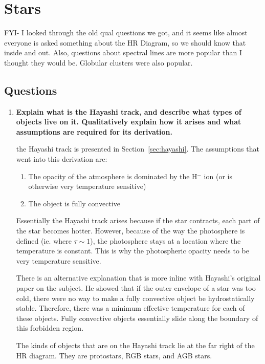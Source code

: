 \section{Stars}

FYI- I looked through the old qual questions we got, and it seems like almost everyone is asked 
something about the HR Diagram, so we should know that inside and out.  Also, questions about 
spectral lines are more popular than I thought they would be.  Globular clusters were also popular.

\subsection{Questions}
\begin{enumerate}
\item \textbf{Explain what is the Hayashi track, and describe what types of objects live on it.
      Qualitatively explain how it arises and what assumptions are required for its derivation.}

       the Hayashi track is presented in Section~\ref{sec:hayashi}.
      The assumptions that went into this derivation are:
      \begin{enumerate}
      \item The opacity of the atmosphere is dominated by the H$^-$ ion
            (or is otherwise very temperature sensitive)
      \item The object is fully convective
      \end{enumerate}
      Essentially the Hayashi track arises because if the star contracts, each part of the star
      becomes hotter.  However, because of the way the photosphere is defined (ie. where $\tau\sim1$),
      the photosphere stays at a location where the temperature is constant.  This is why the
      photospheric opacity needs to be very temperature sensitive.
      
      There is an alternative explanation that is more inline with Hayashi's original paper
      on the subject.  He showed that if the outer envelope of a star was too cold, there were
      no way to make a fully convective object be hydrostatically stable.  Therefore, there was
      a minimum effective temperature for each of these objects.  Fully convective objects
      essentially slide along the boundary of this forbidden region.

      The kinds of objects that are on the Hayashi track lie at the far right of the HR diagram.
      They are protostars, RGB stars, and AGB stars.


\end{enumerate}

